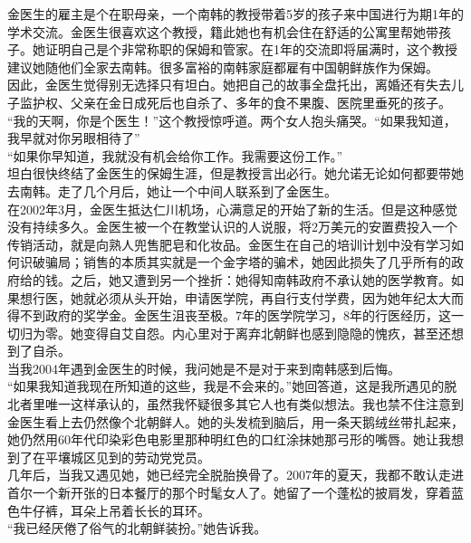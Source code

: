 \begin{multicols}{\theparacolNo}
金医生的雇主是个在职母亲，一个南韩的教授带着5岁的孩子来中国进行为期1年的学术交流。金医生很喜欢这个教授，籍此她也有机会住在舒适的公寓里帮她带孩子。她证明自己是个非常称职的保姆和管家。在1年的交流即将届满时，这个教授建议她随他们全家去南韩。很多富裕的南韩家庭都雇有中国朝鲜族作为保姆。\\

因此，金医生觉得别无选择只有坦白。她把自己的故事全盘托出，离婚还有失去儿子监护权、父亲在金日成死后也自杀了、多年的食不果腹、医院里垂死的孩子。\\

“我的天啊，你是个医生！”这个教授惊呼道。两个女人抱头痛哭。“如果我知道，我早就对你另眼相待了”\\

“如果你早知道，我就没有机会给你工作。我需要这份工作。”\\

坦白很快终结了金医生的保姆生涯，但是教授言出必行。她允诺无论如何都要带她去南韩。走了几个月后，她让一个中间人联系到了金医生。\\

在2002年3月，金医生抵达仁川机场，心满意足的开始了新的生活。但是这种感觉没有持续多久。金医生被一个在教堂认识的人说服，将2万美元的安置费投入一个传销活动，就是向熟人兜售肥皂和化妆品。金医生在自己的培训计划中没有学习如何识破骗局；销售的本质其实就是一个金字塔的骗术，她因此损失了几乎所有的政府给的钱。之后，她又遭到另一个挫折：她得知南韩政府不承认她的医学教育。如果想行医，她就必须从头开始，申请医学院，再自行支付学费，因为她年纪太大而得不到政府的奖学金。金医生沮丧至极。7年的医学院学习，8年的行医经历，这一切归为零。她变得自艾自怨。内心里对于离弃北朝鲜也感到隐隐的愧疚，甚至还想到了自杀。\\

当我2004年遇到金医生的时候，我问她是不是对于来到南韩感到后悔。\\

“如果我知道我现在所知道的这些，我是不会来的。”她回答道，这是我所遇见的脱北者里唯一这样承认的，虽然我怀疑很多其它人也有类似想法。我也禁不住注意到金医生看上去仍然像个北朝鲜人。她的头发梳到脑后，用一条天鹅绒丝带扎起来，她仍然用60年代印染彩色电影里那种明红色的口红涂抹她那弓形的嘴唇。她让我想到了在平壤城区见到的劳动党党员。\\

几年后，当我又遇见她，她已经完全脱胎换骨了。2007年的夏天，我都不敢认走进首尔一个新开张的日本餐厅的那个时髦女人了。她留了一个蓬松的披肩发，穿着蓝色牛仔裤，耳朵上吊着长长的耳环。\\

“我已经厌倦了俗气的北朝鲜装扮。”她告诉我。\\


\end{multicols}
